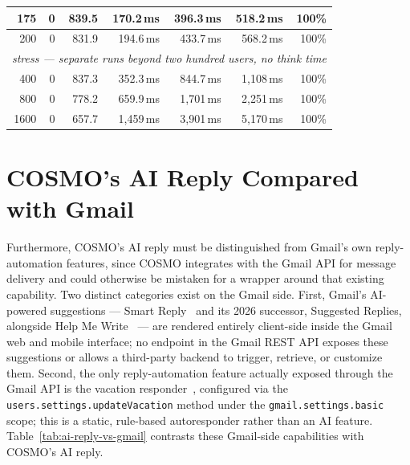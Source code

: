 \documentclass[a4paper]{article}
\begin{document}
\begin{table}[H]
\begin{tabular}{|r|r|r|r|r|r|r|}
\hline
175 & 0 & 839.5 & 170.2\,ms & 396.3\,ms & 518.2\,ms & 100\% \\
\hline
200 & 0 & 831.9 & 194.6\,ms & 433.7\,ms & 568.2\,ms & 100\% \\
\hline
\multicolumn{7}{|l|}{\emph{stress --- separate runs beyond two hundred users, no think time}} \\
\hline
400 & 0 & 837.3 & 352.3\,ms & 844.7\,ms & 1{,}108\,ms & 100\% \\
\hline
800 & 0 & 778.2 & 659.9\,ms & 1{,}701\,ms & 2{,}251\,ms & 100\% \\
\hline
1600 & 0 & 657.7 & 1{,}459\,ms & 3{,}901\,ms & 5{,}170\,ms & 100\% \\
\hline
\end{tabular}
\end{table}

\newpage
\section{COSMO's AI Reply Compared with Gmail}
\label{appendix:gmail}

Furthermore, COSMO's AI reply must be distinguished from Gmail's own 
reply-automation features, since COSMO integrates with the Gmail API 
for message delivery and could otherwise be mistaken for a wrapper 
around that existing capability. Two distinct categories exist on the 
Gmail side. First, Gmail's AI-powered suggestions --- Smart 
Reply~\cite{kannan2016smartreply} and its 2026 successor, Suggested 
Replies, alongside Help Me Write~\cite{google_gmail_gemini_era} --- 
are rendered entirely client-side inside the Gmail web and mobile 
interface; no endpoint in the Gmail REST API exposes these 
suggestions or allows a third-party backend to trigger, retrieve, or 
customize them. Second, the only reply-automation feature actually 
exposed through the Gmail API is the vacation 
responder~\cite{google_gmail_vacation_api}, configured via the 
\texttt{users.settings.updateVacation} method under the 
\texttt{gmail.settings.basic} scope; this is a static, rule-based 
autoresponder rather than an AI feature. 
Table~\ref{tab:ai-reply-vs-gmail} contrasts these Gmail-side 
capabilities with COSMO's AI reply.
\end{document}
